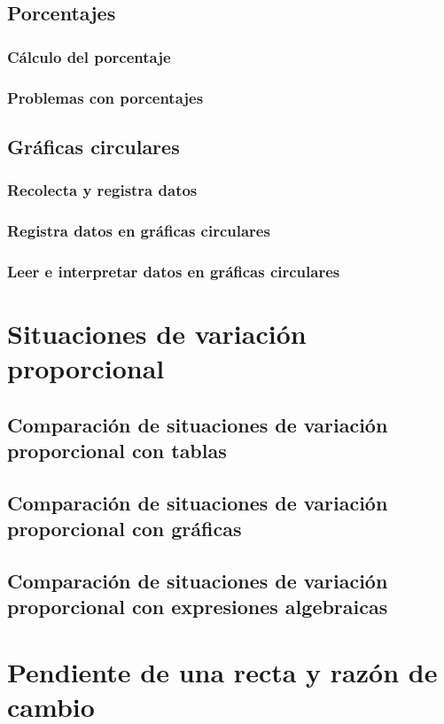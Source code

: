 \documentclass[12pt]{book}
\begin{document}
\begin{mainmatter}
    \subsection{Porcentajes}
    \subsubsection{Cálculo del porcentaje}
    \subsubsection{Problemas con porcentajes}
    \subsection{Gráficas circulares}
    \subsubsection{Recolecta y registra datos}
    \subsubsection{Registra datos en gráficas circulares}
    \subsubsection{Leer e interpretar datos en gráficas circulares}

    \section{Situaciones de variación proporcional}
    \subsection{Comparación de situaciones de variación proporcional con tablas}
    \subsection{Comparación de situaciones de variación proporcional con gráficas}
    \subsection{Comparación de situaciones de variación proporcional con expresiones algebraicas}

    \section{Pendiente de una recta y razón de cambio}

\end{mainmatter}
\end{document}
